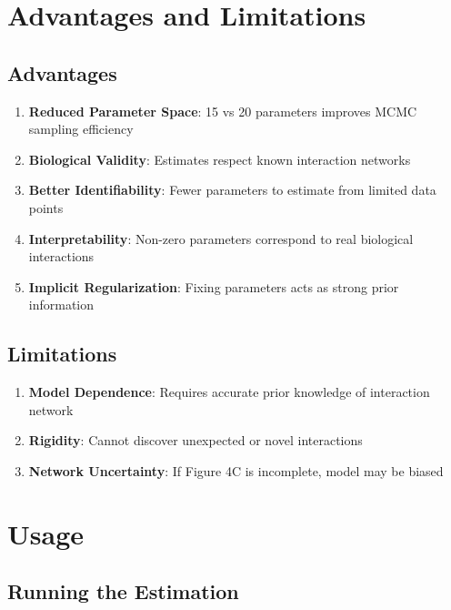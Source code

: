 \documentclass[11pt,a4paper]{article}
\begin{document}
\section{Advantages and Limitations}

\subsection{Advantages}

\begin{enumerate}
    \item \textbf{Reduced Parameter Space}: 15 vs 20 parameters improves MCMC sampling efficiency
    \item \textbf{Biological Validity}: Estimates respect known interaction networks
    \item \textbf{Better Identifiability}: Fewer parameters to estimate from limited data points
    \item \textbf{Interpretability}: Non-zero parameters correspond to real biological interactions
    \item \textbf{Implicit Regularization}: Fixing parameters acts as strong prior information
\end{enumerate}

\subsection{Limitations}

\begin{enumerate}
    \item \textbf{Model Dependence}: Requires accurate prior knowledge of interaction network
    \item \textbf{Rigidity}: Cannot discover unexpected or novel interactions
    \item \textbf{Network Uncertainty}: If Figure 4C is incomplete, model may be biased
\end{enumerate}

\section{Usage}

\subsection{Running the Estimation}
\end{document}
